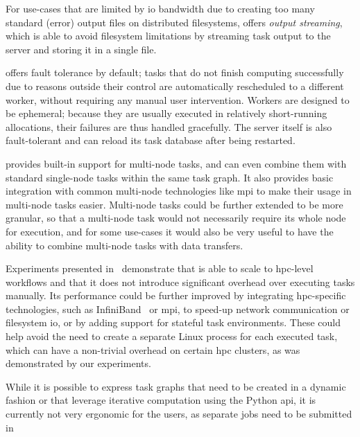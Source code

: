 \begin{description}[wide=0pt]
		For use-cases that are limited by \gls{io} bandwidth due to creating too many
		standard (error) output files on distributed filesystems, \hyperqueue{} offers
		\emph{output streaming}, which is able to avoid filesystem limitations by streaming task output
		to the server and storing it in a single file.
	\item[Fault tolerance] \hyperqueue{} offers fault tolerance by default; tasks that do not
		finish computing successfully due to reasons outside their control are automatically rescheduled
		to a different worker, without requiring any manual user intervention. Workers are designed to be
		ephemeral; because they are usually executed in relatively short-running allocations, their
		failures are thus handled gracefully. The server itself is also fault-tolerant and can reload its
		task database after being restarted.
	\item[Multi-node tasks] \hyperqueue{} provides built-in support for multi-node tasks, and
		can even combine them with standard single-node tasks within the same task graph. It also provides
		basic integration with common multi-node technologies like \gls{mpi} to make their
		usage in multi-node tasks easier. Multi-node tasks could be further extended to be more granular,
		so that a multi-node task would not necessarily require its whole node for execution, and for some
		use-cases it would also be very useful to have the ability to combine multi-node tasks with data
		transfers.
	\item[Scalability] Experiments presented in~ demonstrate that \hyperqueue{} is
		able to scale to \gls{hpc}-level workflows and that it does not introduce
		significant overhead over executing tasks manually. Its performance could be further improved by
		integrating \gls{hpc}-specific technologies, such as
		InfiniBand~\cite{infiniband} or \gls{mpi}, to speed-up network
		communication or filesystem \gls{io}, or by adding support for stateful task
		environments. These could help avoid the need to create a separate Linux process for each executed
		task, which can have a non-trivial overhead on certain \gls{hpc} clusters, as was
		demonstrated by our experiments. %
	\item[Iterative computation] While it is possible to express task graphs that need to be created in a dynamic fashion or that
		leverage iterative computation using the Python \gls{api}, it is currently not
		very ergonomic for the users, as separate \hq{} jobs need to be submitted in

\end{description}
